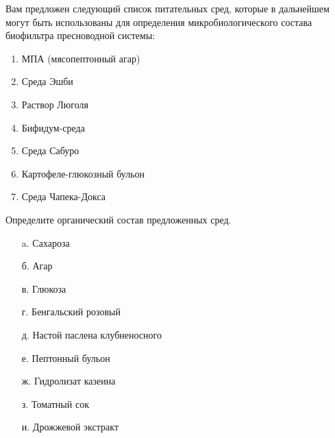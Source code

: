 
Вам предложен следующий список питательных сред, которые в дальнейшем могут быть использованы для определения микробиологического состава биофильтра пресноводной системы:

\begin{enumerate}
    \item МПА (мясопептонный агар)
    \item Среда Эшби
    \item Раствор Люголя
    \item Бифидум-среда
    \item Среда Сабуро
    \item Картофеле-глюкозный бульон
    \item Среда Чапека-Докса
\end{enumerate}

Определите органический состав предложенных сред.  

\begin{enumerate}
    \item[a.] Сахароза
    \item[б.] Агар
    \item[в.] Глюкоза
    \item[г.] Бенгальский розовый
    \item[д.] Настой паслена клубненосного
    \item[е.] Пептонный бульон
    \item[ж.] Гидролизат казеина
    \item[з.] Томатный сок
    \item[и.] Дрожжевой экстракт
\end{enumerate}

